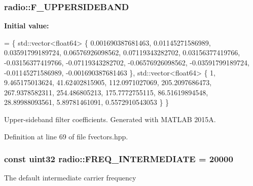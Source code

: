 \hypertarget{namespaceradio_a0ec4548711b6d6ed6867c70b3fc2a413}{
\subsubsection[{F\+\_\+\+U\+P\+P\+E\+R\+S\+I\+D\+E\+B\+A\+N\+D}]{ radio\+::\+F\+\_\+\+U\+P\+P\+E\+R\+S\+I\+D\+E\+B\+A\+N\+D}}\label{namespaceradio_a0ec4548711b6d6ed6867c70b3fc2a413}
{\bfseries Initial value\+:}
\begin{DoxyCode}
= \{ std::vector<float64> \{
        0.001690387681463, 
            0.01145271586989, 
            0.03591799189724, 
            0.06576926098562,
            0.07119343282702,
            0.03156377419766,
            -0.03156377419766,
            -0.07119343282702,
            -0.06576926098562,
            -0.03591799189724,
            -0.01145271586989,
            -0.001690387681463
    \}, std::vector<float64> \{
        1,  
            9.465175013624,
            41.62402815905,
            112.0971027069,
            205.2097686473,    
            267.9378582311,     
            254.486805213,
            175.7772755115,
            86.51619894548,   
            28.89988093561,     
            5.89781461091,
            0.5572910543053   
    \} \}
\end{DoxyCode}
Upper-\/sideband filter coefficients. Generated with M\+A\+T\+L\+A\+B 2015\+A. 

Definition at line 69 of file fvectors.\+hpp.

\hypertarget{namespaceradio_aa82ddc6ba206798fd70ffc25665b3cb6}{
\subsubsection[{F\+R\+E\+Q\+\_\+\+I\+N\+T\+E\+R\+M\+E\+D\+I\+A\+T\+E}]{\setlength{\rightskip}{0pt plus 5cm}const {\bf uint32} radio\+::\+F\+R\+E\+Q\+\_\+\+I\+N\+T\+E\+R\+M\+E\+D\+I\+A\+T\+E = 20000}}\label{namespaceradio_aa82ddc6ba206798fd70ffc25665b3cb6}
The default intermediate carrier frequency 

